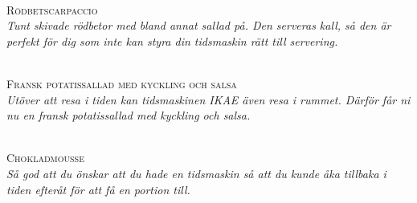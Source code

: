

\begingroup
{}
\begin{center}

\vfill

\newcommand\blockA[1]{\parbox[c][0.23\textheight][c]{0.4\textwidth}{\centering #1}}
\newcommand\blockB[1]{\parbox[c][0.23\textheight][c]{0.6\textwidth}{\raggedright #1}}

\LARGE\textsc{}\\
\large\textsc{Rödbetscarpaccio}\\
\normalsize\textit{Tunt skivade rödbetor med bland annat sallad på. Den serveras kall, så den är perfekt för dig som inte kan styra din tidsmaskin rätt till servering.}

\vfill

\LARGE\textsc{}\\
\large\textsc{Fransk potatissallad med kyckling och salsa}\\ 
\normalsize\textit{Utöver att resa i tiden kan tidsmaskinen IKAE även resa i rummet. Därför får ni nu en fransk potatissallad med kyckling och salsa.}

\vfill

\LARGE\textsc{}\\
\large\textsc{Chokladmousse}\\ 
\normalsize\textit{Så god att du önskar att du hade en tidsmaskin så att du kunde åka tillbaka i tiden efteråt för att få en portion till.}
\vspace{\fill}

\hspace*{\fill}
\hspace*{\fill}

\end{center}
\endgroup
